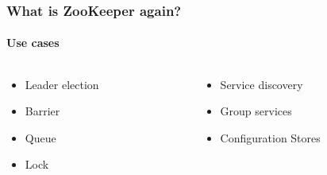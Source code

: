 \begin{frame}
	\frametitle{What is ZooKeeper again?}
	\framesubtitle{Use cases}
	\centering
	\begin{tcolorbox}[colback=accent!5!white,colframe=accent!75!black,width=.7\linewidth, title=Solve various coordination problems in large distributed system]
		\begin{columns}[c]
			\begin{column}{0.45\textwidth}
				\begin{itemize}
					\item Leader election
					\item Barrier
					\item Queue
					\item Lock
				\end{itemize}
			\end{column}
			\begin{column}{0.45\textwidth}
				\begin{itemize}
					\item Service discovery
					\item Group services
					\item<2> Configuration Stores
				\end{itemize}
			\end{column}
		\end{columns}
	\end{tcolorbox}
\end{frame}

